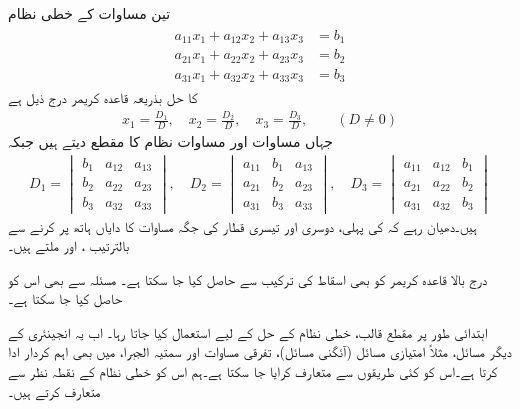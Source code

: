 تین مساوات کے خطی نظام
\begin{gather}
\begin{aligned}\label{مساوات_الجبرا_تین_درجی_خطی_کریمر}
a_{11}x_1+a_{12}x_2+a_{13}x_3&=b_1\\
a_{21}x_1+a_{22}x_2+a_{23}x_3&=b_2\\
a_{31}x_1+a_{32}x_2+a_{33}x_3&=b_3
\end{aligned}
\end{gather}
کا حل بذریعہ قاعدہ کریمر درج ذیل ہے
 \begin{align}
x_1=\frac{D_1}{D},\quad x_2=\frac{D_2}{D},\quad x_3=\frac{D_3}{D},\quad \quad (D\ne 0)
\end{align}
جہاں مساوات  اور مساوات  نظام کا مقطع   دیتے ہیں جبکہ 
\begin{align*}
D_1=
\begin{vmatrix}
b_1&a_{12}&a_{13}\\
b_2&a_{22}&a_{23}\\
b_3&a_{32}&a_{33}
\end{vmatrix},\quad
D_2=
\begin{vmatrix}
a_{11}&b_1&a_{13}\\
a_{21}&b_2&a_{23}\\
a_{31}&b_3&a_{33}
\end{vmatrix},\quad
D_3=
\begin{vmatrix}
a_{11}&a_{12}&b_1\\
a_{21}&a_{22}&b_2\\
a_{31}&a_{32}&b_3
\end{vmatrix}
\end{align*}
ہیں۔دھیان رہے کہ  کی پہلی، دوسری اور تیسری قطار کی جگہ مساوات  کا دایاں ہاتھ پر کرنے سے بالترتیب ،  اور  ملتے ہیں۔

درج بالا قاعدہ کریمر کو بھی اسقاط کی ترکیب سے حاصل کیا جا سکتا ہے۔  مسئلہ  سے بھی اس کو حاصل کیا جا سکتا ہے۔
 
ابتدائی طور پر مقطع قالب، خطی نظام کے حل کے لیے استعمال کیا جاتا رہا۔ اب یہ انجینئری کے دیگر مسائل، مثلاً امتیازی مسائل (آئگنی مسائل)، تفرقی مساوات اور سمتیہ الجبرا، میں بھی اہم کردار ادا کرتا ہے۔اس کو کئی طریقوں سے متعارف کرایا جا سکتا ہے۔ہم اس کو خطی نظام کے نقطہ نظر سے  متعارف کرتے ہیں۔

